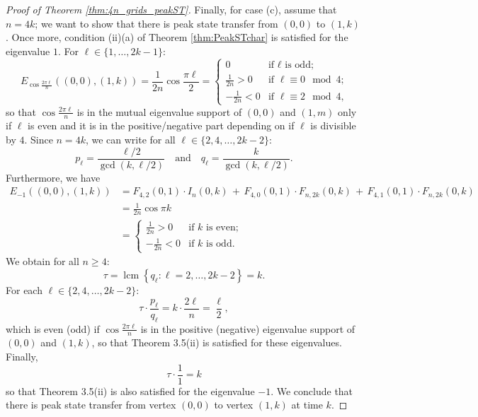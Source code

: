 \documentclass{article}
\numberwithin{equation}{section}
\DeclareMathOperator{\lcm}{lcm}
\begin{document}
\begin{proof}[Proof of Theorem \ref{thm:4n_grids_peakST}]
Finally, for case (c), assume that $n = 4k$; we want to show that there is peak state transfer from $(0,0)$ to $(1,k)$. Once more, condition (ii)(a) of Theorem \ref{thm:PeakSTchar} is satisfied for the eigenvalue $1$. For $\ell \in \{1,\ldots,2k-1\}$:
\[
E_{\cos\frac{2\pi \ell}{n}}((0,0),(1,k)) = \frac{1}{2n} \cos\frac{\pi\ell}{2} = \begin{cases}
0 &\text{if $\ell$ is odd;} \\
\frac{1}{2n} > 0 &\text{if $\ell \equiv 0 \mod 4$;} \\
-\frac{1}{2n} < 0 &\text{if $\ell \equiv 2 \mod 4$,}
\end{cases}
\]
so that $\cos\frac{2\pi\ell}{n}$ is in the mutual eigenvalue support of $(0,0)$ and $(1,m)$ only if $\ell$ is even and it is in the positive/negative part depending on if $\ell$ is divisible by $4$. Since $n = 4k$, we can write for all $\ell \in \{2,4,\ldots,2k-2\}$:
\[
p_\ell = \frac{\ell/2}{\gcd(k,\ell/2)} \quad \text{and} \quad q_\ell = \frac{k}{\gcd(k,\ell/2)}.
\]
Furthermore, we have
\begin{align*}
E_{-1}((0,0),(1,k)) &= F_{4,2}(0,1) \cdot I_n(0,k) \,+\, F_{4,0}(0,1) \cdot F_{n,2k}(0,k) \,+\, F_{4,1}(0,1)\cdot F_{n,2k}(0,k) \\
&= \frac{1}{2n}\cos\pi k \\
&= \begin{cases}
\frac{1}{2n} > 0 &\text{if $k$ is even;} \\
-\frac{1}{2n} < 0 &\text{if $k$ is odd.}
\end{cases}
\end{align*}
We obtain for all $n\geq 4$:
\[
\tau = \lcm\left\{q_\ell : \ell = 2,\ldots,2k-2\right\} = k.
\]
For each $\ell \in \{2,4,\ldots,2k-2\}$:
\[
\tau \cdot \frac{p_\ell}{q_\ell} = k\cdot \frac{2\ell}{n} = \frac{\ell}{2},
\]
which is even (odd) if $\cos\frac{2\pi\ell}{n}$ is in the positive (negative) eigenvalue support of $(0,0)$ and $(1,k)$, so that Theorem 3.5(ii) is satisfied for these eigenvalues. Finally,
\[
\tau \cdot \frac{1}{1} = k
\]
so that Theorem 3.5(ii) is also satisfied for the eigenvalue $-1$. We conclude that there is peak state transfer from vertex $(0,0)$ to vertex $(1,k)$ at time $k$.
\end{proof}
\end{document}
